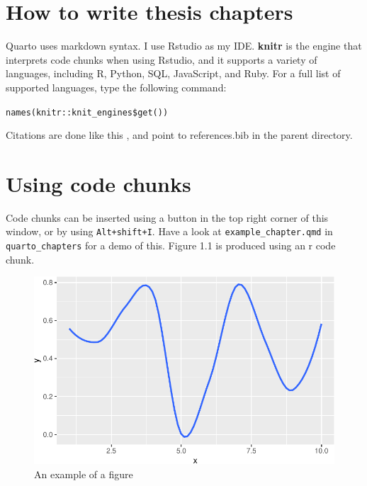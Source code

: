 \documentclass[../main.tex]{subfiles}
\begin{document}
\ifdefined\Shaded\renewenvironment{Shaded}{\begin{tcolorbox}[sharp corners, breakable, borderline west={3pt}{0pt}{shadecolor}, interior hidden, frame hidden, boxrule=0pt, enhanced]}{\end{tcolorbox}}\fi

\hypertarget{how-to-write-thesis-chapters}{%
\section{How to write thesis
chapters}\label{how-to-write-thesis-chapters}}

Quarto uses markdown syntax. I use Rstudio as my IDE. \textbf{knitr} is
the engine that interprets code chunks when using Rstudio, and it
supports a variety of languages, including R, Python, SQL, JavaScript,
and Ruby. For a full list of supported languages, type the following
command:

\texttt{names(knitr::knit\_engines\$get())}

Citations are done like this \cite{strain_2023}, and point to
references.bib in the parent directory.

\hypertarget{using-code-chunks}{%
\section{Using code chunks}\label{using-code-chunks}}

Code chunks can be inserted using a button in the top right corner of
this window, or by using \texttt{Alt+shift+I}. Have a look at
\texttt{example\_chapter.qmd} in \texttt{quarto\_chapters} for a demo of
this. Figure 1.1 is produced using an r code chunk.

\begin{figure}

{\centering \includegraphics{example_chapter_files/figure-latex/my-code-chunk-1.pdf}

}

\caption{An example of a figure}

\end{figure}
\end{document}
